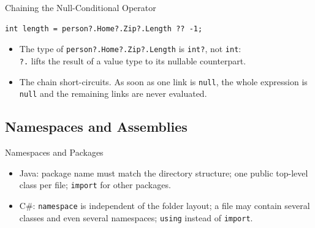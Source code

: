 \begin{solutionframe}{Chaining the Null-Conditional Operator}
  \begin{lstlisting}[basicstyle=\scriptsize\ttfamily]
int length = person?.Home?.Zip?.Length ?? -1;
  \end{lstlisting}
  \begin{itemize}
    \item The type of \texttt{person?.Home?.Zip?.Length} is \texttt{int?}, not
      \texttt{int}:\\
       \texttt{?.} lifts the result of a value type to its
      nullable counterpart.
    \item The chain short-circuits. As soon as one link is \texttt{null}, the
      whole expression is \texttt{null} and the remaining links are never
      evaluated.
  \end{itemize}
  \vspace{3ex}

  \vspace{1ex}

\end{solutionframe}

\subsection{Namespaces and Assemblies}

\begin{frame}{Namespaces and Packages}
  \begin{itemize}
    \item Java: package name must match the directory structure; one
      public top-level class per file; \texttt{import} for other packages.
    \item C\#: \texttt{namespace} is independent of the folder layout;
      a file may contain several classes and even several namespaces;
      \texttt{using} instead of \texttt{import}.
  \end{itemize}
\end{frame}

